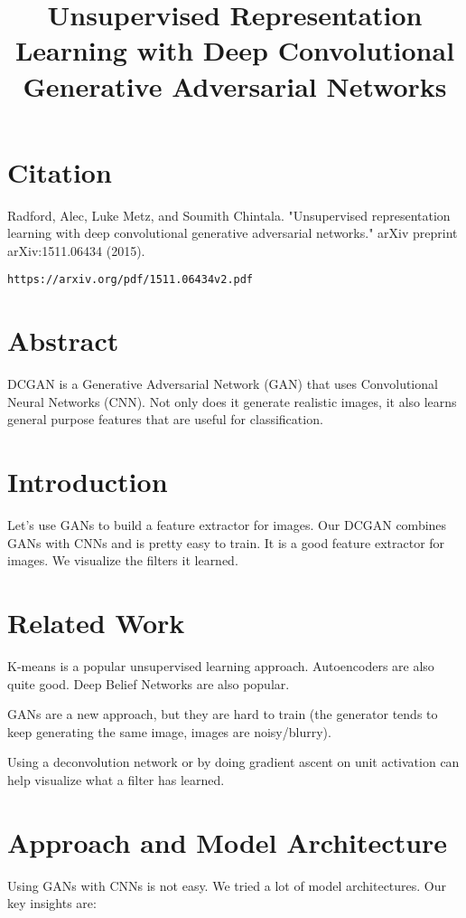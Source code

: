 \documentclass[a4paper]{article}
\title{Unsupervised Representation Learning with Deep Convolutional
Generative Adversarial Networks}
\date{}
\begin{document}
\maketitle

\section{Citation}
Radford, Alec, Luke Metz, and Soumith Chintala. "Unsupervised representation learning with deep convolutional generative adversarial networks." arXiv preprint arXiv:1511.06434 (2015).

\begin{verbatim}
https://arxiv.org/pdf/1511.06434v2.pdf
\end{verbatim}

\section{Abstract}
DCGAN is a Generative Adversarial Network (GAN) that uses Convolutional
Neural Networks (CNN). Not only does it generate realistic images, it also
learns general purpose features that are useful for classification.

\section{Introduction}
Let's use GANs to build a feature extractor for images. Our DCGAN combines
GANs with CNNs and is pretty easy to train. It is a good feature extractor for
images. We visualize the filters it learned.

\section{Related Work}
K-means is a popular unsupervised learning approach. Autoencoders are also
quite good. Deep Belief Networks are also popular.

GANs are a new approach, but they are hard to train (the generator
tends to keep generating the same image, images are noisy/blurry).

Using a deconvolution network or by doing gradient ascent on unit activation
can help visualize what a filter has learned.

\section{Approach and Model Architecture}
Using GANs with CNNs is not easy. We tried a lot of model architectures. Our key
insights are:
\end{document}
